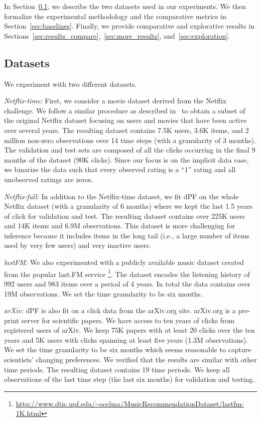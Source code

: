 \documentclass{sig-alternate}
\begin{document}
In Section~\ref{sec:datasets}, we describe the two datasets used in our
experiments. We then formalize the experimental methodology and the comparative
metrics in Section~\ref{sec:baselines}. Finally, we provide comparative and
explorative results in Sections~\ref{sec:results_compare},~\ref{sec:more_results}, and~\ref{sec:exploration}.

\subsection{Datasets}
\label{sec:datasets}
\noindent
We experiment with two different datasets. 

\emph{Netflix-time:} First, we consider a movie
dataset derived from the Netflix challenge. We follow a similar procedure as
described in~\citet{Li:2011:CCF:2283696.2283780} to obtain a subset of the
original Netflix dataset focusing on users and movies that have been active
over several years. The resulting dataset contains 7.5K users, 3.6K items, and
2 million non-zero observations over 14 time steps (with a granularity of 3
months). The validation and test sets are composed of all the clicks occurring
in the final 9 months of the dataset (90K clicks). Since our focus is on the
implicit data case, we binarize the data such that every observed rating is a
``1'' rating and all unobserved ratings are zeros. 

\emph{Netflix-full:} In addition to the Netflix-time dataset, we fit dPF on the whole
Netflix dataset (with a granularity of 6 months) where we kept the last 1.5
years of click for validation and test. The resulting dataset contains over
225K users and 14K items and 6.9M observations. This dataset is more
challenging for inference because it includes items in the long tail (i.e., a
large number of items used by very few users) and very inactive users.

\emph{lastFM:} We also experimented with a publicly available music dataset
created from the popular last.FM service
\footnote{\url{http://www.dtic.upf.edu/~ocelma/MusicRecommendationDataset/lastfm-1K.html}}.
The dataset encodes the listening history of 992 users and 983 items over
a period of 4 years. In total the data contains over 19M observations.  We
set the time granularity to be six months. 

\emph{arXiv:} dPF is also fit on a click data from the arXiv.org site.
arXiv.org is a pre-print server for scientific papers. We have access to ten
years of clicks from registered users of arXiv. We keep 75K papers with at
least 20 clicks over the ten years and 5K users with clicks spanning at least
five years (1.3M observations). We set the time granularity to be six months
which seems reasonable to capture scientists' changing preferences. We verified
that the results are similar with other time periods. The resulting dataset
contains 19 time periods. We keep all observations of the last time step (the
last six months) for validation and testing. 
\end{document}
